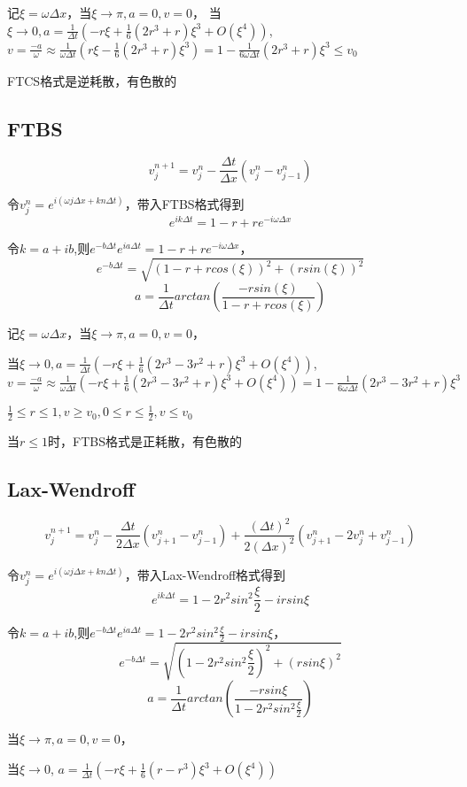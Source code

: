 \documentclass{article}
\begin{document}
记$\xi=\omega \Delta x$，当$\xi\longrightarrow \pi, a=0, v=0$，
当$\xi\longrightarrow 0, a=\frac{1}{\Delta t}(-r \xi+\frac{1}{6} \left(2 r^3+r\right) \xi^3+O\left(\xi^4\right))$,
$v=\frac{-a}{\omega}\approx \frac{1}{\omega \Delta t}(r \xi-\frac{1}{6} \left(2 r^3+r\right) \xi^3)=1-\frac{1}{6\omega \Delta t} \left(2 r^3+r\right) \xi^3 \leq v_0$

FTCS格式是逆耗散，有色散的
\subsection{FTBS}
$$v_j^{n+1}=v_j^n-\frac{\Delta t}{\Delta x}(v_j^n-v_{j-1}^n)$$

令$v_j^n=e^{i(\omega j\Delta x+k n \Delta t)}$，带入FTBS格式得到
$$e^{ik\Delta t}=1-r+re^{-i\omega \Delta x}$$

令$k=a+ib$,则$e^{-b\Delta t}e^{ia\Delta t}=1-r+re^{-i\omega \Delta x}$，
$$e^{-b\Delta t}=\sqrt{(1-r+rcos(\xi))^2+(rsin(\xi))^2}$$
$$a=\frac{1}{\Delta t}arctan(\frac{-rsin(\xi)}{1-r+rcos(\xi)})$$

记$\xi=\omega \Delta x$，当$\xi\longrightarrow \pi, a=0, v=0$，

当$\xi\longrightarrow 0, a=\frac{1}{\Delta t}(-r \xi+\frac{1}{6} \left(2 r^3-3 r^2+r\right) \xi^3+O\left(\xi^4\right))$,
$v=\frac{-a}{\omega}\approx \frac{1}{\omega \Delta t}(-r \xi+\frac{1}{6} \left(2 r^3-3 r^2+r\right) \xi^3+O\left(\xi^4\right))
    =1-\frac{1}{6 \omega \Delta t}\left(2 r^3-3 r^2+r\right) \xi^3$

$\frac{1}{2}\leq r \leq 1,v\geq v_0,0\leq r \leq \frac{1}{2},v\leq v_0$

当$r\leq 1$时，FTBS格式是正耗散，有色散的
\subsection{Lax-Wendroff}
$$v_j^{n+1}=v_j^n-\frac{\Delta t}{2\Delta x}(v_{j+1}^n-v_{j-1}^n)+\frac{(\Delta t)^2}{2(\Delta x)^2}(v_{j+1}^n-2v_j^n+v_{j-1}^n)$$

令$v_j^n=e^{i(\omega j\Delta x+k n \Delta t)}$，带入Lax-Wendroff格式得到
$$e^{ik\Delta t}=1-2r^2sin^2\frac{\xi}{2}-irsin\xi$$

令$k=a+ib$,则$e^{-b\Delta t}e^{ia\Delta t}=1-2r^2sin^2\frac{\xi}{2}-irsin\xi$，
$$e^{-b\Delta t}=\sqrt{(1-2r^2sin^2\frac{\xi}{2})^2+(rsin\xi)^2}$$
$$a=\frac{1}{\Delta t}arctan(\frac{-rsin\xi}{1-2r^2sin^2\frac{\xi}{2}})$$

当$\xi\longrightarrow \pi, a=0, v=0$，

当$\xi\longrightarrow 0$, 
$a=\frac{1}{\Delta t}(-r \xi+\frac{1}{6} \left(r-r^3\right) \xi^3+O\left(\xi^4\right))$
\end{document}
